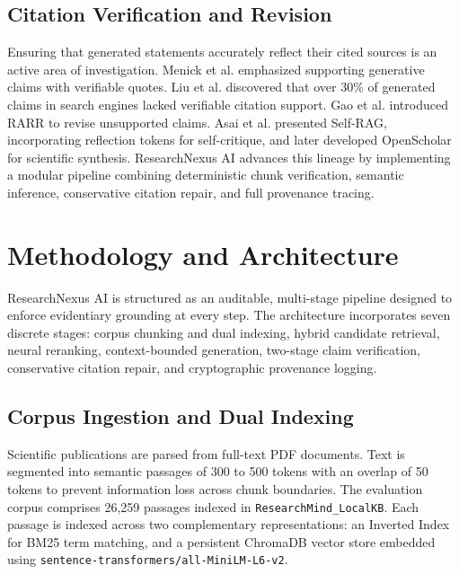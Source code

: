 \documentclass[conference]{IEEEtran}
\begin{document}
\subsection{Citation Verification and Revision}
Ensuring that generated statements accurately reflect their cited sources is an active area of investigation. Menick et al. \cite{menick2022teaching} emphasized supporting generative claims with verifiable quotes. Liu et al. \cite{liu2023evaluating} discovered that over 30\% of generated claims in search engines lacked verifiable citation support. Gao et al. \cite{gao2023rarr} introduced RARR to revise unsupported claims. Asai et al. \cite{asai2024selfrag} presented Self-RAG, incorporating reflection tokens for self-critique, and later developed OpenScholar \cite{asai2026openscholar} for scientific synthesis. ResearchNexus AI advances this lineage by implementing a modular pipeline combining deterministic chunk verification, semantic inference, conservative citation repair, and full provenance tracing.

\section{Methodology and Architecture}
ResearchNexus AI is structured as an auditable, multi-stage pipeline designed to enforce evidentiary grounding at every step. The architecture incorporates seven discrete stages: corpus chunking and dual indexing, hybrid candidate retrieval, neural reranking, context-bounded generation, two-stage claim verification, conservative citation repair, and cryptographic provenance logging.

\subsection{Corpus Ingestion and Dual Indexing}
Scientific publications are parsed from full-text PDF documents. Text is segmented into semantic passages of 300 to 500 tokens with an overlap of 50 tokens to prevent information loss across chunk boundaries. The evaluation corpus comprises 26,259 passages indexed in \texttt{ResearchMind\_LocalKB}. Each passage is indexed across two complementary representations: an Inverted Index for BM25 term matching, and a persistent ChromaDB vector store embedded using \texttt{sentence-transformers/all-MiniLM-L6-v2}.
\end{document}
